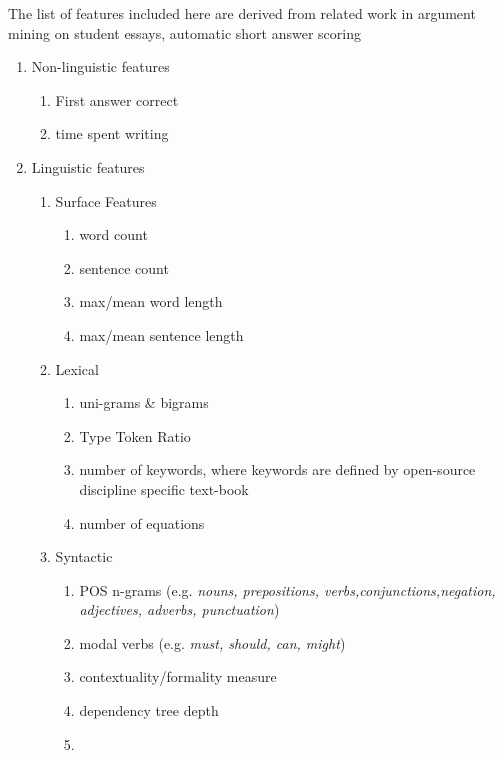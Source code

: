 \documentclass[sigconf]{acmart}
\begin{document}
The list of features included here are derived 
from related work in argument 
mining 
\cite{habernal_which_2016}\cite{persing_end--end_2016}
 on student 
essays, automatic short answer scoring 
\cite{mohler_text--text_2009}

\begin{enumerate}
	\item Non-linguistic features
	
	\begin{enumerate}
		\item First answer correct
		\item time spent writing
	\end{enumerate}
	
	
	
	\item Linguistic features
	
	\begin{enumerate}
		
		\item Surface Features
		\begin{enumerate}
			\item word count
			\item sentence count
			\item max/mean word length
			\item max/mean sentence length
		\end{enumerate}
		
		\item Lexical
		\begin{enumerate}
			\item uni-grams \& bigrams
			\item Type Token Ratio
			\item number of keywords, where 
			keywords are defined by open-source 
			discipline specific text-book
			\item number of equations
		\end{enumerate}
		
		\item Syntactic
		\begin{enumerate}
			\item POS n-grams (e.g. \textit{nouns, 
			prepositions, 
				verbs,conjunctions,negation, 
				adjectives, 
				adverbs, punctuation})
			\item modal verbs (e.g. \textit{must, 
			should, can, might})
			\item contextuality/formality measure 
			\cite{heylighen_variation_2002}
			\item dependency tree depth
			\item 
		\end{enumerate}
		

\end{enumerate}
\end{enumerate}
\end{document}
